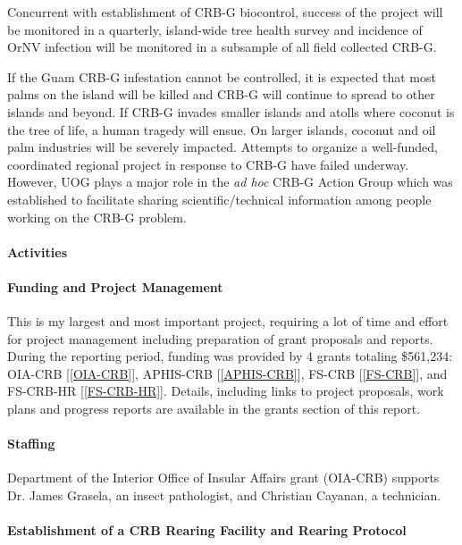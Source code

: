 \begin{refsection}
Concurrent with establishment of CRB-G biocontrol, success of the
project will be monitored in a quarterly, island-wide tree health
survey and incidence of OrNV infection will be monitored in a subsample
of all field collected CRB-G.

If the Guam CRB-G infestation cannot be controlled, it is expected
that most palms on the island will be killed and CRB-G will continue
to spread to other islands and beyond. If CRB-G invades smaller islands
and atolls where coconut is the tree of life, a human tragedy will
ensue. On larger islands, coconut and oil palm industries will be
severely impacted. Attempts to organize a well-funded, coordinated regional project in response to CRB-G have failed underway. However, UOG plays a major role in the \textit{ad hoc} CRB-G Action Group which was established to facilitate sharing scientific/technical information among people working on the CRB-G problem.

\paragraph{Activities}

\paragraph{Funding and Project Management} This is my largest and most important project, requiring a lot of time and effort for project management including preparation of grant proposals and reports. During the reporting period, funding was provided by 4 grants totaling \$561,234: OIA-CRB [\ref{OIA-CRB}], APHIS-CRB [\ref{APHIS-CRB}], FS-CRB [\ref{FS-CRB}], and FS-CRB-HR [\ref{FS-CRB-HR}]. Details, including links to project proposals, work plans and progress reports are available in the grants section of this report.

\paragraph{Staffing}

Department of the Interior Office of Insular Affairs grant (OIA-CRB) supports Dr. James Grasela, an insect pathologist, and Christian Cayanan, a technician.

\paragraph{Establishment of a CRB Rearing Facility and Rearing Protocol}


\end{refsection}
